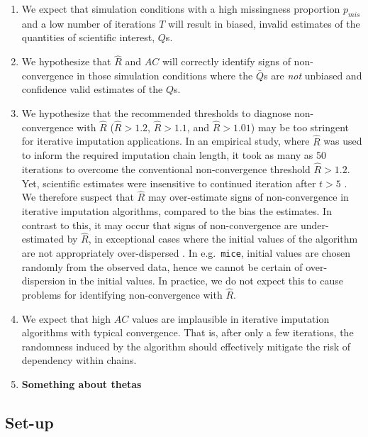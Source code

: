 \documentclass[Royal,times,sageh]{sagej}
\begin{document}
\begin{enumerate}
\def\labelenumi{\arabic{enumi}.}
\item
  We expect that simulation conditions with a high missingness
  proportion \(p_{mis}\) and a low number of iterations \(T\) will
  result in biased, invalid estimates of the quantities of scientific
  interest, \(Q\)s.
\item
  We hypothesize that \(\widehat{R}\) and \(AC\) will correctly identify
  signs of non-convergence in those simulation conditions where the
  \(\bar{Q}\)s are \emph{not} unbiased and confidence valid estimates of
  the \(Q\)s.
\item
  We hypothesize that the recommended thresholds to diagnose
  non-convergence with \(\widehat{R}\) (\(\widehat{R} > 1.2\),
  \(\widehat{R} > 1.1\), and \(\widehat{R} > 1.01\)) may be too
  stringent for iterative imputation applications. In an empirical
  study, where \(\widehat{R}\) was used to inform the required
  imputation chain length, it took as many as 50 iterations to overcome
  the conventional non-convergence threshold \(\widehat{R}>1.2\). Yet,
  scientific estimates were insensitive to continued iteration after
  \(t>5\) \citep{lace07}. We therefore suspect that \(\widehat{R}\) may
  over-estimate signs of non-convergence in iterative imputation
  algorithms, compared to the bias the estimates. In contrast to this,
  it may occur that signs of non-convergence are under-estimated by
  \(\widehat{R}\), in exceptional cases where the initial values of the
  algorithm are not appropriately over-dispersed \citep[p.~437]{broo98}.
  In e.g.~\texttt{mice}, initial values are chosen randomly from the
  observed data, hence we cannot be certain of over-dispersion in the
  initial values. In practice, we do not expect this to cause problems
  for identifying non-convergence with \(\widehat{R}\).
\item
  We expect that high \(AC\) values are implausible in iterative
  imputation algorithms with typical convergence. That is, after only a
  few iterations, the randomness induced by the algorithm should
  effectively mitigate the risk of dependency within chains.
\item
  \textbf{Something about thetas}
\end{enumerate}

\hypertarget{set-up}{%
\subsection{Set-up}\label{set-up}}
\end{document}
